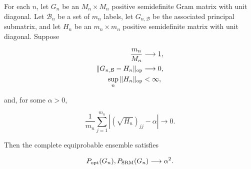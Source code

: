 \begin{theorem}
\label{thm:exceptional-sector-transfer}
For each \(n\), let \(G_n\) be an \(M_n\times M_n\) positive semidefinite
Gram matrix with unit diagonal. Let \(\mathcal B_n\) be a set of \(m_n\)
labels, let \(G_{n,\mathcal B}\) be the associated principal submatrix, and
let \(H_n\) be an \(m_n\times m_n\) positive semidefinite matrix with unit
diagonal. Suppose

\begin{align}
\frac{m_n}{M_n}&\longrightarrow1,
\label{eq:transfer-mass}\\
\|G_{n,\mathcal B}-H_n\|_{\rm op}&\longrightarrow0,
\label{eq:transfer-gram}\\
\sup_n\|H_n\|_{\rm op}&<\infty,
\label{eq:transfer-spectral-bound}
\end{align}

and, for some \(\alpha>0\),

\begin{equation}
\label{eq:transfer-local-diagonal}
\frac1{m_n}\sum_{j=1}^{m_n}
\left|(\sqrt{H_n})_{jj}-\alpha\right|\longrightarrow0.
\end{equation}

Then the complete equiprobable ensemble satisfies

\begin{equation}
\label{eq:transfer-conclusion}
P_{\rm opt}(G_n),P_{\rm SRM}(G_n)\longrightarrow\alpha^2.
\end{equation}
\end{theorem}

